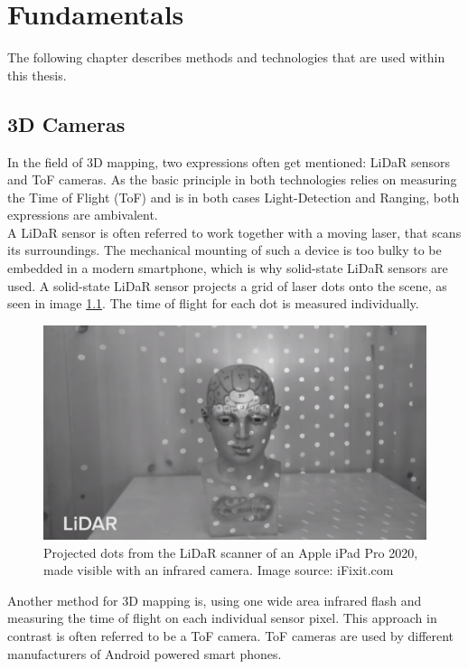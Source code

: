 \chapter{Fundamentals}
\label{sec:Fundamentals}
The following chapter describes methods and technologies that are used within this thesis.
\section{3D Cameras}
\label{sec:ToFCamera}
In the field of 3D mapping, two expressions often get mentioned: LiDaR sensors and ToF cameras. As the basic principle in both technologies relies on measuring the Time of Flight (ToF) and is in both cases Light-Detection and Ranging, both expressions are ambivalent.\\
A LiDaR sensor is often referred to work together with a moving laser, that scans its surroundings.\cite{Techradar_Lidar} The mechanical mounting of such a device is too bulky to be embedded in a modern smartphone, which is why solid-state LiDaR sensors are used. A solid-state LiDaR sensor projects a grid of laser dots onto the scene, as seen in image \ref{im:iPadLidar}. The time of flight for each dot is measured individually.
\begin{figure}[H]
    \centering
    \includegraphics[width=1.0\textwidth]{images/ifixit_lidar.png}
    \caption{Projected dots from the LiDaR scanner of an Apple iPad Pro 2020, made visible with an infrared camera. Image source: iFixit.com}
    \label{im:iPadLidar}
\end{figure}
Another method for 3D mapping is, using one wide area infrared flash and measuring the time of flight on each individual sensor pixel. This approach in contrast is often referred to be a ToF camera. ToF cameras are used by different manufacturers of Android powered smart phones.\\
